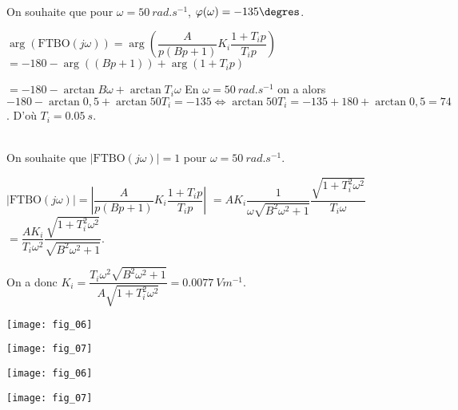 \ifprof
\begin{corrige}~\\
On souhaite que  pour $\omega=\SI{50}{rad.s^{-1}}$, $\varphi(\omega)=-135\degres $.

$\arg\left(\text{FTBO}(j\omega)\right) =\arg\left(\dfrac{A}{p\left(Bp+1\right)}K_i\dfrac{1+T_ip}{T_ip}\right)	$
$ =-180-\arg\left(\left(Bp+1\right)\right)  + \arg\left(1+T_ip\right)	$

$ =-180-\arctan B\omega + \arctan T_i \omega 	$
En $\omega=\SI{50}{rad.s^{-1}}$ on a alors 
$ -180-\arctan 0,5 + \arctan 50T_i =-135 \Leftrightarrow  \arctan 50T_i =-135+180+\arctan 0,5 =74$. D'où $T_i = \SI{0,05}{s}$.
\end{corrige}
\else
\fi




\ifprof
\begin{corrige}~\\
On souhaite que $|\text{FTBO}(j\omega)|=1$ pour $\omega=\SI{50}{rad.s^{-1}}$.

$|\text{FTBO}(j\omega)| =\left|\dfrac{A}{p\left(Bp+1\right)}K_i\dfrac{1+T_ip}{T_ip}\right|$
$=A K_i\dfrac{1}{\omega \sqrt{B^2\omega^2+1}}\dfrac{\sqrt{1+T_i^2\omega^2}}{T_i \omega }$
$=\dfrac{A K_i}{T_i \omega^2}\dfrac{\sqrt{1+T_i^2\omega^2}}{ \sqrt{B^2\omega^2+1}}$.

On a donc $K_i = \dfrac{T_i \omega^2\sqrt{B^2\omega^2+1}}{A\sqrt{1+T_i^2\omega^2}}=\SI{0,0077}{Vm^{-1}}$.

\end{corrige}
\else
\fi



\ifprof
\begin{center}
\texttt{[image: fig\_06]}
\end{center}

\begin{center}
\texttt{[image: fig\_07]}
\end{center}

\else
\begin{marginfigure}
\texttt{[image: fig\_06]}
\end{marginfigure}

\begin{marginfigure}
\texttt{[image: fig\_07]}
\end{marginfigure}
\fi


